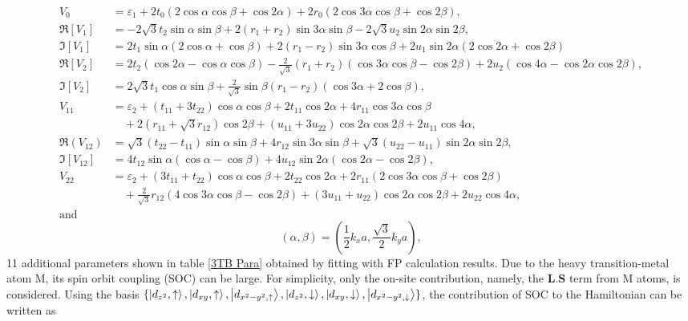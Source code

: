 \documentclass[12pt,english,a4paper]{article}
\begin{document}
	\begin{align*}
		V_0 &= \varepsilon_1 + 2t_0 (2\cos\alpha\cos\beta + \cos2\alpha) + 2r_0 (2\cos3\alpha\cos\beta+\cos2\beta),\\
		\Re[V_1]&= -2\sqrt{3}t_2 \sin \alpha \sin \beta + 2(r_1 + r_2)\sin 3 \alpha \sin \beta - 2\sqrt{3} u_2 \sin 2\alpha \sin 2\beta,\\
		\Im[V_1] &= 2 t_1 \sin \alpha (2 \cos \alpha +\cos \beta) + 2(r_1 - r_2) \sin 3\alpha \cos \beta + 2u_1 \sin 2\alpha (2\cos 2\alpha + \cos 2\beta)\\
		\Re[V_2] &= 2t_2 (\cos 2\alpha - \cos \alpha \cos \beta) -\frac{2}{\sqrt{3}} (r_1 + r_2 ) (\cos 3\alpha \cos \beta - \cos 2 \beta) + 2u_2 (\cos 4\alpha -\cos 2\alpha \cos 2\beta),\\
		\Im[V_2] &= 2\sqrt{3} t_1 \cos \alpha \sin \beta +\frac{2}{\sqrt{3}} \sin \beta (r_1 -r_2 )(\cos 3\alpha + 2\cos \beta),\\
		V_{11} & = \varepsilon_2 + (t_{11}+3t_{22})\cos \alpha \cos \beta + 2 t_{11} \cos 2\alpha + 4r_{11} \cos 3\alpha \cos \beta \\ &\quad +2 (r_{11} + \sqrt{3} r_{12}) \cos 2\beta + (u_{11} + 3 u_{22})\cos 2 \alpha \cos 2\beta + 2 u_{11} \cos 4\alpha,\\
		\Re(V_{12}) &= \sqrt{3} (t_{22} - t_{11}) \sin \alpha \sin \beta +4 r_{12} \sin 3\alpha \sin \beta + \sqrt{3} (u_{22} - u_{11}) \sin 2\alpha \sin 2\beta,\\
		\Im[V_{12}] &= 4 t_{12} \sin \alpha (\cos \alpha -\cos \beta) + 4u_{12} \sin 2\alpha (\cos 2\alpha - \cos 2\beta),\\
		V_{22} &= \varepsilon_2 +(3t_{11} + t_{22}) \cos \alpha \cos \beta + 2 t_{22} \cos 2 \alpha + 2 r_{11}(2\cos 3\alpha \cos \beta + \cos 2 \beta) \\&\quad + \frac{2}{\sqrt{3}} r_{12} (4\cos 3\alpha \cos \beta - \cos 2\beta) + (3 u_{11} + u_{22}) \cos 2\alpha \cos 2\beta + 2u_{22} \cos 4\alpha,\\
		\text{and}&
		\end{align*}
		\begin{equation}		
			(\alpha,\beta) =  (\frac{1}{2}k_x a, \frac{\sqrt{3}}{2}k_y a),
		\end{equation}
	11 additional parameters shown in table \ref{3TB Para} obtained by fitting with FP calculation results. Due to the heavy transition-metal atom M, its spin orbit coupling (SOC) can be large. For simplicity, only the on-site contribution, namely, the $\textbf{L}.\textbf{S}$ term from M atoms, is considered. Using the basis $\{\ket{d_{z^2},\uparrow},\ket{d_{xy},\uparrow},\ket{d_{x^2-y^2,\uparrow}},\ket{d_{z^2},\downarrow},\ket{d_{xy},\downarrow},\ket{d_{x^2-y^2,\downarrow}}\}$, the contribution of SOC to the Hamiltonian can be written as
\end{document}
